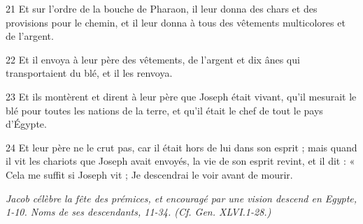 \par 21 Et sur l'ordre de la bouche de Pharaon, il leur donna des chars et des provisions pour le chemin, et il leur donna à tous des vêtements multicolores et de l'argent.
\par 22 Et il envoya à leur père des vêtements, de l'argent et dix ânes qui transportaient du blé, et il les renvoya.
\par 23 Et ils montèrent et dirent à leur père que Joseph était vivant, qu'il mesurait le blé pour toutes les nations de la terre, et qu'il était le chef de tout le pays d'Égypte.
\par 24 Et leur père ne le crut pas, car il était hors de lui dans son esprit ; mais quand il vit les chariots que Joseph avait envoyés, la vie de son esprit revint, et il dit : « Cela me suffit si Joseph vit ; Je descendrai le voir avant de mourir.


\par \textit{Jacob célèbre la fête des prémices, et encouragé par une vision descend en Egypte, 1-10. Noms de ses descendants, 11-34. (Cf. Gen. XLVI.1-28.)}

